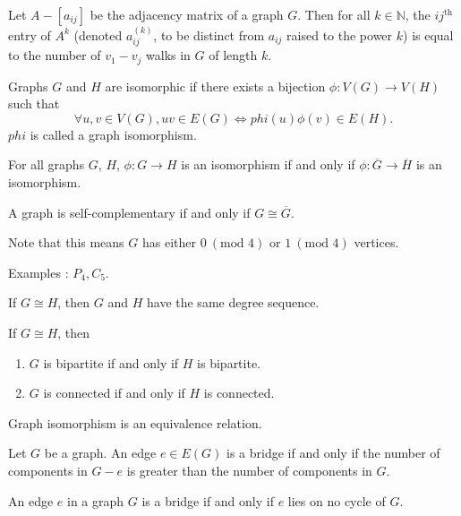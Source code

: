 \documentclass{article}
\newcommand{\N}{\mathbb N}
\begin{document}
\medskip{}

    Let $A - [a_{ij}]$ be the adjacency matrix of a graph $G$. Then for all $k \in \N$, the $ij^{\text{th}}$ entry of $A^k$ (denoted $a_{ij}^{(k)}$, to be distinct from $a_{ij}$ raised to the power $k$) is equal to the number of $v_1 - v_j$ walks in $G$ of length $k$.

\medskip{}

    Graphs $G$ and $H$ are isomorphic if there exists a bijection $\phi: V(G) \to V(H)$ such that $$\forall u,v \in V(G), uv \in E(G) \iff phi(u)\phi(v) \in E(H).$$
    $phi$ is called a graph isomorphism.

\medskip{}

    For all graphs $G$, $H$, $\phi: G \to H$ is an isomorphism if and only if $\phi: \overline G \to \overline H$ is an isomorphism.

\medskip{}

    A graph is self-complementary if and only if $G \cong \overline G$.

    Note that this means $G$ has either $0~(\text{mod } 4)$ or $1~(\text{mod } 4)$ vertices.

    Examples : $P_4, C_5$.

\medskip{}

    If $G \cong H$, then $G$ and $H$ have the same degree sequence.

\medskip{}

    If $G \cong H$, then
    \begin{enumerate}
        \item $G$ is bipartite if and only if $H$ is bipartite.
        \item $G$ is connected if and only if $H$ is connected.
    \end{enumerate}

\medskip{}

    Graph isomorphism is an equivalence relation.

\medskip{}

    Let $G$ be a graph. An edge $e \in E(G)$ is a bridge if and only if the number of components in $G - e$ is greater than the number of components in $G$.

\medskip{}

    An edge $e$ in a graph $G$ is a bridge if and only if $e$ lies on no cycle of $G$.
\end{document}
